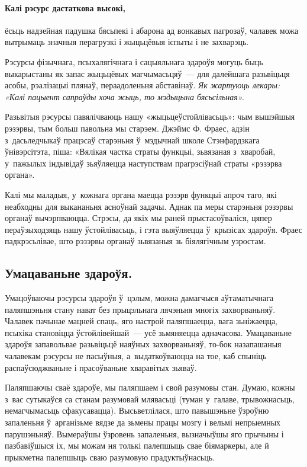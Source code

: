 \paragraph{Калі рэсурс дастаткова высокі,} ёсьць надзейная падушка бясьпекі і абарона ад вонкавых пагрозаў, чалавек можа вытрымаць значныя перагрузкі і жыцьцёвыя іспыты і не захварэць.

Рэсурсы фізычнага, псыхалягічнага і сацыяльнага здароўя могуць быць выкарыстаны як запас жыцьцёвых магчымасьцяў~--- для далейшага разьвіцьця асобы, рэалізацыі плянаў, пераадоленьня абставінаў. \emph{Як жартуюць лекары: «Калі пацыент сапраўды хоча жыць, то мэдыцына бясьсільная».}

Разьвітыя рэсурсы павялічваюць нашу «жыцьцеўстойлівасьць»: чым вышэйшыя рэзэрвы, тым больш павольна мы старэем. Джэймс Ф. Фраес, адзін з~дасьледчыкаў працэсаў старэньня ў~мэдычнай школе Стэнфардзкага ўнівэрсітэта, піша: «Вялікая частка страты функцыі, зьвязаная з~хваробай, у~пажылых індывідаў зьяўляецца наступствам прагрэсіўнай страты «рэзэрва органа». 

Калі мы маладыя, у~кожнага органа маецца рэзэрв функцыі апроч таго, які неабходны для выкананьня асноўнай задачы. Аднак па меры старэньня рэзэрвы органаў вычэрпваюцца. Стрэсы, да якіх мы раней прыстасоўваліся, цяпер пераўзыходзяць нашу ўстойлівасьць, і гэта выяўляецца ў~крызісах здароўя. Фраес падкрэсьлівае, што рэзэрвы органаў зьвязаныя зь біялягічным узростам.

\subsection*{Умацаваньне здароўя.}

Умацоўваючы рэсурсы здароўя ў~цэлым, можна дамагчыся аўтаматычнага паляпшэньня стану нават без прыцэльнага лячэньня многіх захворваньняў. Чалавек пачынае мацней спаць, яго настрой паляпшаецца, вага зьніжаецца, псыхіка становіцца ўстойлівейшай~--- усё зьмяняецца адначасова. Умацаваньне здароўя запавольвае разьвіцьцё наяўных захворваньняў, то-бок назапашаныя чалавекам рэсурсы не пасыўныя, а~выдаткоўваюцца на тое, каб спыніць распаўсюджваньне і прасоўваньне хваравітых зьяваў.


Паляпшаючы сваё здароўе, мы паляпшаем і свой разумовы стан. Думаю, кожны з~вас сутыкаўся са станам разумовай млявасьці (туман у~галаве, трывожнасьць, немагчымасьць сфакусавацца). Высьветлілася, што павышэньне ўзроўню запаленьня ў~арганізьме вядзе да зьмены працы мозгу і вельмі непрыемных парушэньняў. Вымераўшы ўзровень запаленьня, вызначыўшы яго прычыны і пазбавіўшыся іх, мы можам ня толькі палепшыць свае біямаркеры, але й прыкметна палепшыць сваю разумовую прадуктыўнасьць. 

